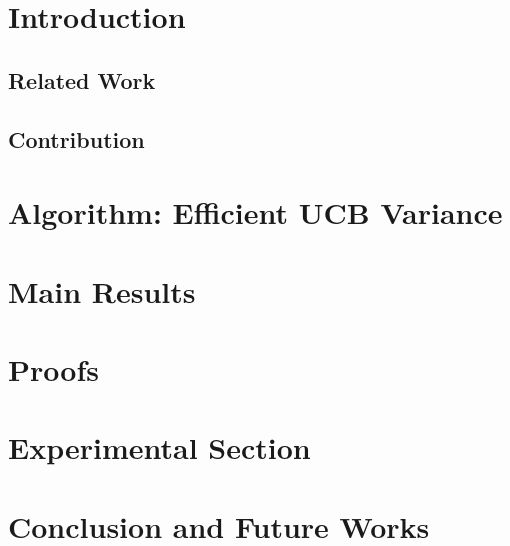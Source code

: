 \documentclass{llncs}
\begin{document}
\section{Introduction}
\label{sec:intro}


\subsection{Related Work}
\label{sec:related}



\subsection{Contribution}
\label{sec:contri}


\section{Algorithm: Efficient UCB Variance}
\label{sec:eucbv}


\section{Main Results} 
\label{sec:results}


\section{Proofs}
\label{sec:proofTheorem}


\section{Experimental Section}
\label{sec:expt}


\section{Conclusion and Future Works}
\label{sec:conc}



\clearpage
\newpage



\end{document}
